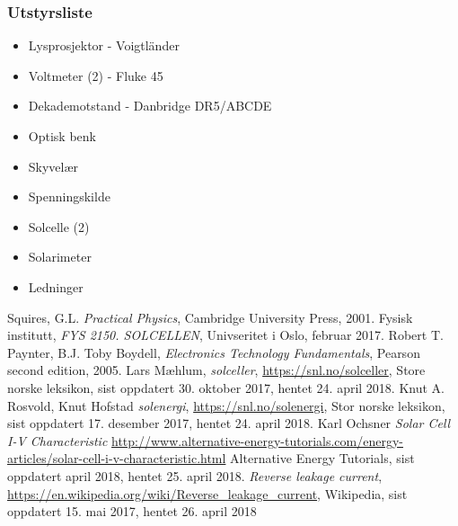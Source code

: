 \documentclass[%
 reprint,
 amsmath,amssymb,
 aps,
 norsk,
 booktabs
]{revtex4-1}
\begin{document}
\subsubsection*{Utstyrsliste}
\begin{itemize}
\label{utstyr}
\item Lysprosjektor - Voigtländer
\item Voltmeter (2) - Fluke 45
\item Dekademotstand - Danbridge DR5/ABCDE
\item Optisk benk
\item Skyvelær
\item Spenningskilde
\item Solcelle (2)
\item Solarimeter
\item Ledninger
\end{itemize}
\begin{thebibliography}{9}
Squires, G.L. \emph{Practical Physics}, Cambridge University Press, 2001.
Fysisk institutt, \emph{FYS 2150. SOLCELLEN}, Univseritet i Oslo, februar 2017.
Robert T. Paynter, B.J. Toby Boydell, \emph{Electronics Technology Fundamentals}, Pearson second edition, 2005.
Lars Mæhlum, \emph{solceller}, \url{https://snl.no/solceller}, Store norske leksikon, sist oppdatert 30. oktober 2017, hentet 24. april 2018.
Knut A. Rosvold, Knut Hofstad \emph{solenergi}, \url{https://snl.no/solenergi}, Stor norske leksikon, sist oppdatert 17. desember 2017, hentet 24. april 2018.
Karl Ochsner \emph{Solar Cell I-V Characteristic} \url{http://www.alternative-energy-tutorials.com/energy-articles/solar-cell-i-v-characteristic.html} Alternative Energy Tutorials, sist oppdatert april 2018, hentet 25. april 2018.
\emph{Reverse leakage current}, \url{https://en.wikipedia.org/wiki/Reverse_leakage_current}, Wikipedia, sist oppdatert 15. mai 2017, hentet 26. april 2018
\end{thebibliography}
\end{document}
